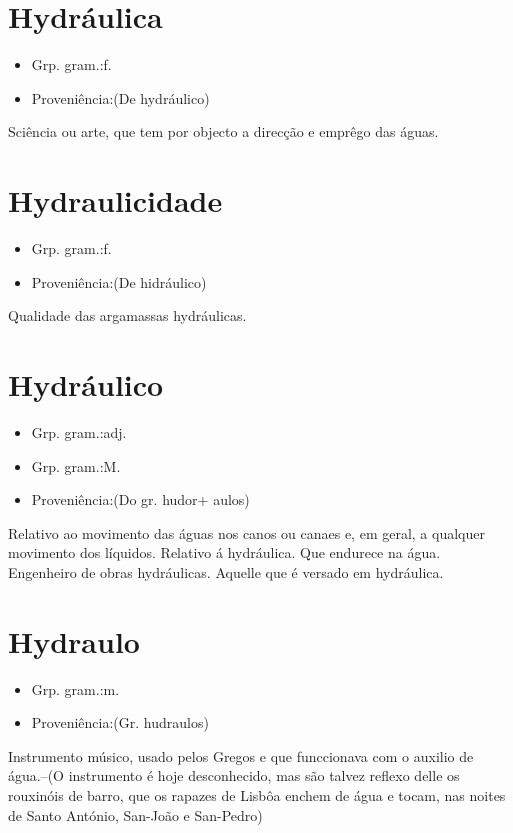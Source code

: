\documentclass{article}
\begin{document}
\section{Hydráulica}
\begin{itemize}
\item {Grp. gram.:f.}
\end{itemize}
\begin{itemize}
\item {Proveniência:(De \textunderscore hydráulico\textunderscore )}
\end{itemize}
Sciência ou arte, que tem por objecto a direcção e emprêgo das águas.
\section{Hydraulicidade}
\begin{itemize}
\item {Grp. gram.:f.}
\end{itemize}
\begin{itemize}
\item {Proveniência:(De \textunderscore hidráulico\textunderscore )}
\end{itemize}
Qualidade das argamassas hydráulicas.
\section{Hydráulico}
\begin{itemize}
\item {Grp. gram.:adj.}
\end{itemize}
\begin{itemize}
\item {Grp. gram.:M.}
\end{itemize}
\begin{itemize}
\item {Proveniência:(Do gr. \textunderscore hudor\textunderscore  + \textunderscore aulos\textunderscore )}
\end{itemize}
Relativo ao movimento das águas nos canos ou canaes e, em geral, a qualquer movimento dos líquidos.
Relativo á hydráulica.
Que endurece na água.
Engenheiro de obras hydráulicas.
Aquelle que é versado em hydráulica.
\section{Hydraulo}
\begin{itemize}
\item {Grp. gram.:m.}
\end{itemize}
\begin{itemize}
\item {Proveniência:(Gr. \textunderscore hudraulos\textunderscore )}
\end{itemize}
Instrumento músico, usado pelos Gregos e que funccionava com o auxilio de água.--(O instrumento é hoje desconhecido, mas são talvez reflexo delle os \textunderscore rouxinóis de barro\textunderscore , que os rapazes de Lisbôa enchem de água e tocam, nas noites de Santo António, San-João e San-Pedro)
\end{document}
